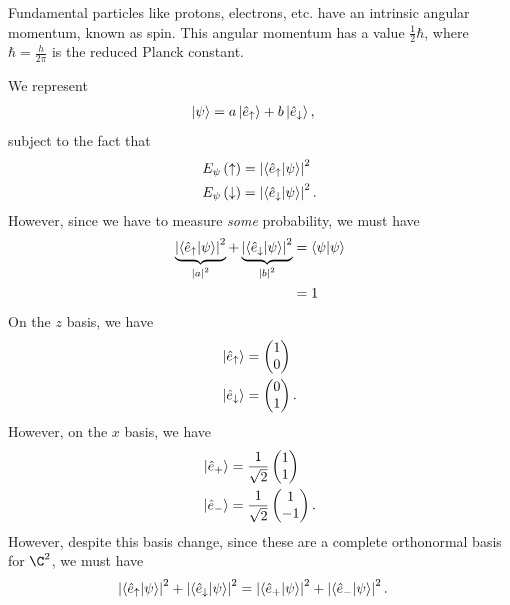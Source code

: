 \documentclass[10pt]{mypackage}
\begin{document}
\begin{example}
  Fundamental particles like protons, electrons, etc. have an intrinsic angular momentum, known as spin. This angular momentum has a value $\frac{1}{2}\hbar$, where $\hbar = \frac{h}{2\pi}$ is the reduced Planck constant.\newline

  We represent
  \begin{align*}
    \ket{\psi} &= a\ket{\hat{e}_{\uparrow}} + b\ket{\hat{e}_{\downarrow}},
  \end{align*}
  subject to the fact that
  \begin{align*}
    E_{\psi}\left(\uparrow\right) &= \left\vert \braket{\hat{e}_{\uparrow}}{\psi} \right\vert^2\\
    E_{\psi}\left(\downarrow\right) &= \left\vert \braket{\hat{e}_{\downarrow}}{\psi} \right\vert^2.
  \end{align*}
  However, since we have to measure \textit{some} probability, we must have
  \begin{align*}
    \underbrace{\left\vert \braket{\hat{e}_{\uparrow}}{\psi} \right\vert^2}_{\left\vert a \right\vert^2} + \underbrace{\left\vert \braket{\hat{e}_{\downarrow}}{\psi} \right\vert^2}_{\left\vert b \right\vert^2} &= \braket{\psi}{\psi}\\
                                                                                                                              &= 1
  \end{align*}
  On the $z$ basis, we have
  \begin{align*}
    \ket{\hat{e}_{\uparrow}} &= \begin{pmatrix}1\\0\end{pmatrix}\\
    \ket{\hat{e}_{\downarrow}} &= \begin{pmatrix}0\\1\end{pmatrix}.
  \end{align*}
  However, on the $x$ basis, we have
  \begin{align*}
    \ket{\hat{e}_{+}} &= \frac{1}{\sqrt{2}}\begin{pmatrix}1\\1\end{pmatrix}\\
    \ket{\hat{e}_{-}} &= \frac{1}{\sqrt{2}}\begin{pmatrix}1\\-1\end{pmatrix}.
  \end{align*}
  However, despite this basis change, since these are a complete orthonormal basis for $\C^2$, we must have
  \begin{align*}
    \left\vert \braket{\hat{e}_{\uparrow}}{\psi} \right\vert^2 + \left\vert \braket{\hat{e}_{\downarrow}}{\psi} \right\vert^2 &= \left\vert \braket{\hat{e}_{+}}{\psi} \right\vert^2 + \left\vert \braket{\hat{e}_{-}}{\psi} \right\vert^2.
  \end{align*}
\end{example}
\end{document}
